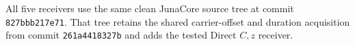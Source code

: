 All five receivers use the same clean JunaCore source tree at commit \texttt{827bbb217e71}. That tree retains the shared carrier-offset and duration acquisition from commit \texttt{261a4418327b} and adds the tested Direct $C,z$ receiver.
